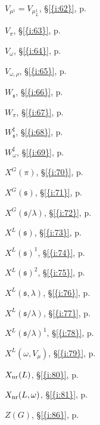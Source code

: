 \documentclass[11pt]{amsart}
\theoremstyle{definition}
\begin{document}
\begin{Parallel}[v]{0.48\textwidth}{0.48\textwidth}
{$V_{\mu^1} = V_{\mu^1_L}$, {\S \ref{{i:62}}, p. }

$V_{\pi}$, {\S \ref{{i:63}}, p. }

$V_{\omega}$, {\S \ref{{i:64}}, p. }

$V_{\omega, \rho}$, {\S \ref{{i:65}}, p. }

$W_{{\mathfrak s}}$, {\S \ref{{i:66}}, p. }

$W_{\pi}$, {\S \ref{{i:67}}, p. }

$W_{{\mathfrak s}}^\sharp$, {\S \ref{{i:68}}, p. }

$W^{\sharp}_{\omega}$, {\S \ref{{i:69}}, p. }

$X^G(\pi)$, {\S \ref{{i:70}}, p. }

$X^G({{\mathfrak s}})$, {\S \ref{{i:71}}, p. }

$X^G({{\mathfrak s}}/ \lambda)$, {\S \ref{{i:72}}, p. }

$X^L({{\mathfrak s}})$, {\S \ref{{i:73}}, p. }

$X^L({{\mathfrak s}})^1$, {\S \ref{{i:74}}, p. }

$X^L({{\mathfrak s}})^2$, {\S \ref{{i:75}}, p. }

$X^L({{\mathfrak s}},\lambda)$, {\S \ref{{i:76}}, p. }

$X^L({{\mathfrak s}} / \lambda)$, {\S \ref{{i:77}}, p. }

$X^L({{\mathfrak s}} / \lambda)^1$, {\S \ref{{i:78}}, p. }

$X^L(\omega, V_{\mu})$, {\S \ref{{i:79}}, p. }

$X_{{\rm nr}} (L)$, {\S \ref{{i:80}}, p. }

$X_{{\rm nr}} (L,\omega)$, {\S \ref{{i:81}}, p. }

$Z(G)$, {\S \ref{{i:86}}, p. } 
} \end{Parallel}
\end{document}
